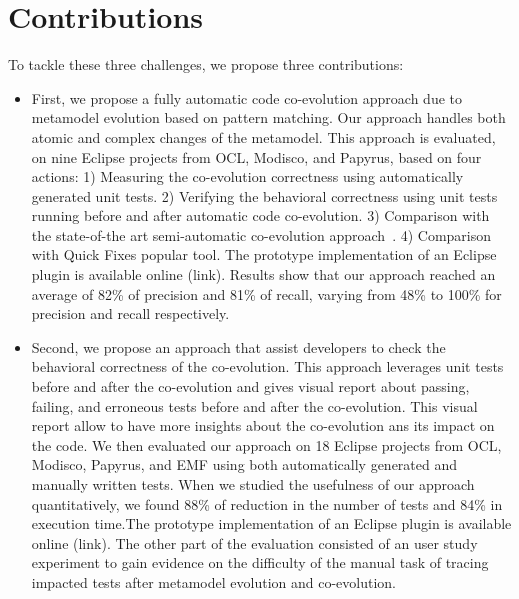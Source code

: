 \section{Contributions}
To tackle these three challenges, we propose three contributions:
\begin{itemize}[label=]

	\item First, we propose a fully automatic code co-evolution approach due to metamodel evolution based on pattern matching. Our approach handles both atomic and complex changes of the metamodel. This approach is evaluated, on nine Eclipse projects from OCL, Modisco, and Papyrus, based on four actions: 1) Measuring the co-evolution correctness using automatically generated unit tests. 2) Verifying the behavioral correctness using unit tests running before and after automatic code co-evolution. 3) Comparison with the state-of-the art semi-automatic co-evolution approach~\cite{Khelladi2020}. 4) Comparison with Quick Fixes popular tool. The prototype implementation of an Eclipse plugin is available online (link).
	  Results show that our approach reached an average of 82\% of precision and 81\% of recall, varying from 48\% to 100\% for precision and recall respectively.
	
	
	\item Second, we propose an approach that assist developers to check the behavioral correctness of the co-evolution. This approach leverages unit tests before and after the co-evolution and gives visual report about passing, failing, and erroneous tests before and after the co-evolution. This visual report allow to have more insights about the co-evolution ans its impact on the code. We then evaluated our approach on 18 Eclipse projects from
	OCL, Modisco, Papyrus, and EMF using both automatically generated and manually written tests. When we studied the usefulness of our approach quantitatively, we found 88\% of reduction in the number of tests and 84\% in execution time.The prototype implementation of an Eclipse plugin is available online (link). The other part of the evaluation consisted of an user study experiment to gain evidence on the difficulty of the manual task of tracing impacted tests after metamodel
	evolution and co-evolution. 
	

\end{itemize}
